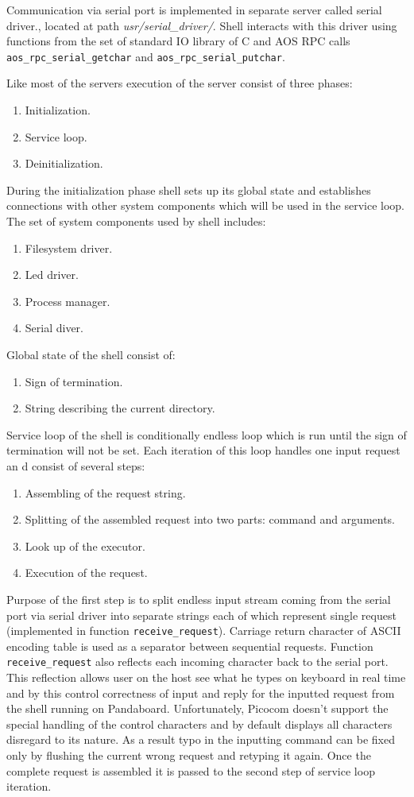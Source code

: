 \documentclass[a4paper,10pt]{article}
\newcommand{\filepath}[1]{\emph{ #1}}
\begin{document}
	Communication via serial port is implemented in separate server called serial driver., located at path \filepath{usr/serial\_driver/}.
	Shell interacts with this driver using functions from the set of standard IO library of C and AOS RPC calls \lstinline!aos_rpc_serial_getchar! and \lstinline!aos_rpc_serial_putchar!.
	
	Like most of the servers execution of the server consist of three phases:
	\begin{enumerate}
		\item Initialization.
		\item Service loop.
		\item Deinitialization.
	\end{enumerate}
	During the initialization phase shell sets up its global state and establishes connections with other system components which will be used in the service loop.
	The set of system components used by shell includes:
	\begin{enumerate}
		\item Filesystem driver.
		\item Led driver.
		\item Process manager.
		\item Serial diver.
	\end{enumerate}
	Global state of the shell consist of:
	\begin{enumerate}
		\item Sign of termination.
		\item String describing the current directory.
	\end{enumerate}
	
	Service loop of the shell is conditionally endless loop which is run until the sign of termination will not be set. 
	Each iteration of this loop handles one input request an d consist of several steps:
	\begin{enumerate}
		\item Assembling of the request string.
		\item Splitting of the assembled request into two parts: command and arguments.
		\item Look up of the executor.
		\item Execution of the request.
	\end{enumerate} 
	Purpose of the first step is to split endless input stream coming from the serial port via serial driver into separate strings each of which represent single request (implemented in function \lstinline!receive_request!).
	Carriage return character of ASCII encoding table is used as a separator between sequential requests.
	Function \lstinline!receive_request! also reflects each incoming character back to the serial port.
	This reflection allows user on the host see what he types on keyboard in real time and by this control correctness of input and reply for the inputted request from the shell running on Pandaboard.
	Unfortunately, Picocom doesn't support the special handling of the control characters and by default displays all characters disregard to its nature.
	As a result typo in the inputting command can be fixed only by flushing the current wrong request and retyping it again.
	Once the complete request is assembled it is passed to the second step of service loop iteration.
	  
\end{document}

